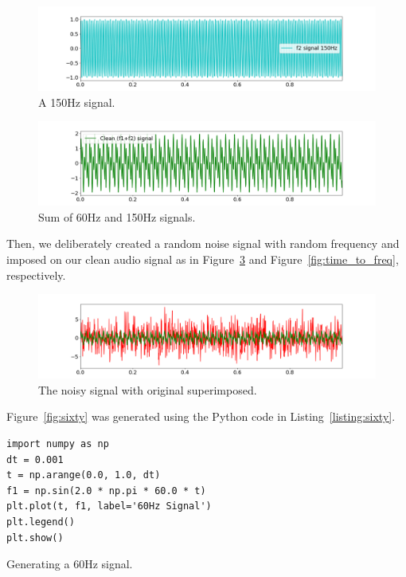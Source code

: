 \documentclass[a4paper, 12pt]{scrartcl}
\begin{document}
\begin{figure}[H] 
  \centering
  \includegraphics[width=\textwidth]{img/signal_150hz.png}
  \caption{A 150Hz signal.}
  \label{fig:onefifty}
\end{figure}

\begin{figure}[H] 
  \centering
  \includegraphics[width=\textwidth]{img/sum_signals.png}
  \caption{Sum of 60Hz and 150Hz signals.}
  \label{fig:sumsignals}
\end{figure}

Then, we deliberately created a random noise signal with random frequency and imposed on our clean audio signal as in Figure~\ref{fig:original_noisy} and Figure~\ref{fig:time_to_freq}, respectively.

\begin{figure}[H] 
  \centering
  \includegraphics[width=\textwidth]{img/original_noisy.png}
  \caption{The noisy signal with original superimposed.}
  \label{fig:original_noisy}
\end{figure}

Figure~\ref{fig:sixty} was generated using the Python code in Listing~\ref{listing:sixty}.

\begin{listing}[h]
\begin{verbatim}
import numpy as np
dt = 0.001
t = np.arange(0.0, 1.0, dt)
f1 = np.sin(2.0 * np.pi * 60.0 * t)
plt.plot(t, f1, label='60Hz Signal')
plt.legend()
plt.show()
\end{verbatim}
\caption{Generating a 60Hz signal.}
\label{listing:sixty}
\end{listing}
\end{document}
